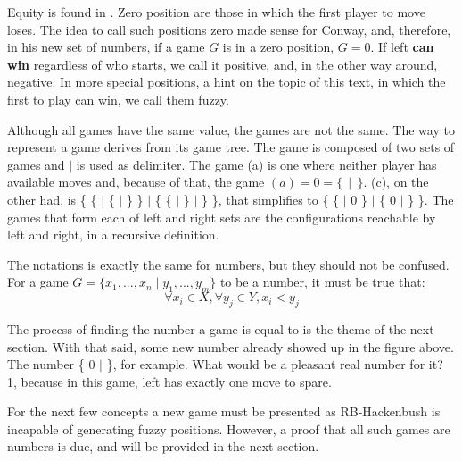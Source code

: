 Equity is found in . Zero position are those in which the first player to move loses. The idea to call such positions zero made sense for Conway, and, therefore, in his new set of numbers, if a game $G$ is in a zero position, $G = 0$. If left \textbf{can win} regardless of who starts, we call it positive, and, in the other way around, negative. In more special positions, a hint on the topic of this text, in which the first to play can win, we call them fuzzy.



Although all games have the same value, the games are not the same. The  way to represent a game derives from its game tree. The game is composed of two sets of games and $\mid$ is used as delimiter. The game (a) is one where neither player has available moves and, because of that, the game $(a) = 0 = \{\,\mid\,\}$. (c), on the other had, is \{ \{ $\mid$ \{ $\mid$ \} \} $\mid$  \{ \{ $\mid$ \} $\mid$  \} \}, that simplifies to \{ \{ $\mid$ 0 \} $\mid$  \{ 0 $\mid$  \} \}. The games that form each of left and right sets are the configurations reachable by left and right, in a recursive definition.

The notations is exactly the same for numbers, but they should not be confused. For a game  $G = \{x_1, ..., x_n \mid y_1, ..., y_m\}$ to be a number, it must be true that:
$$\forall x_i \in X, \forall y_j \in Y, x_i < y_j$$

The process of finding the number a game is equal to is the theme of the next section. With that said, some new number already showed up in the figure above. The number \{ 0 $\mid$ \}, for example. What would be a pleasant real number for it? 1, because in this game, left has exactly one move to spare.

For the next few concepts a new game must be presented as RB-Hackenbush is incapable of generating fuzzy positions. However, a proof that all such games are numbers is due, and will be provided in the next section.

\begin{figure} [!ht]
	\begin{center}
	\end{center}
	\caption{}
\end{figure}

